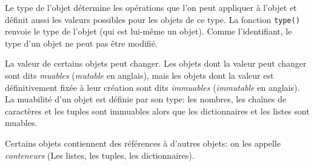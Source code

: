 Le type de l'objet détermine les opérations que l'on peut appliquer à l'objet et définit aussi les valeurs possibles pour les objets de ce type. La fonction \texttt{type()} renvoie le type de l'objet (qui est lui-même un objet). Comme l'identifiant, le type d'un objet ne peut pas être modifié.
\medskip

La valeur de certains objets peut changer. Les objets dont la valeur peut changer sont dits \textit{muables} (\textit{mutable} en anglais), mais les objets dont la valeur est définitivement fixée à leur création sont dits \textit{immuables} (\textit{immutable} en anglais). La muabilité d'un objet est définie par son type: les nombres, les chaînes de caractères et les tuples sont immuables alors que les dictionnaires et les listes sont muables.
\medskip

Certains objets contiennent des références à d'autres objets: on les appelle \textit{conteneurs} (Les listes, les tuples, les dictionnaires).

